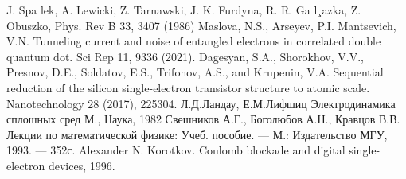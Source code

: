 \documentclass[12pt,a4paper]{report}
\begin{document}
\begin{thebibliography}{99}
	 J. Spa lek, A. Lewicki, Z. Tarnawski, J. K. Furdyna, R. R. Ga l¸azka, Z.
Obuszko, Phys. Rev B 33, 3407 (1986)
     Maslova, N.S., Arseyev, P.I.  Mantsevich, V.N. Tunneling current and noise of entangled electrons in correlated double quantum dot. Sci Rep 11, 9336 (2021).
	 Dagesyan, S.A., Shorokhov, V.V., Presnov, D.E., Soldatov, E.S., Trifonov, A.S., and Krupenin, V.A. Sequential reduction of the silicon single-electron transistor structure to atomic scale. Nanotechnology 28 (2017), 225304.
	Л.Д.Ландау, Е.М.Лифшиц Электродинамика сплошных сред М., Наука, 1982
	 Свешников А.Г., Боголюбов А.Н., Кравцов В.В. Лекции по математической физике: Учеб. пособие. — М.: Издательство МГУ, 1993. — 352с.
	 Alexander N. Korotkov. Coulomb blockade and digital single-electron devices, 1996.
\end{thebibliography}
\end{document}
